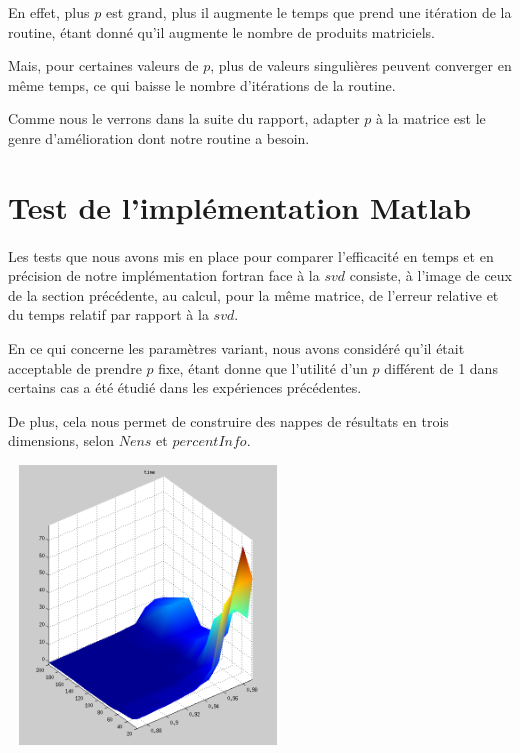 \documentclass[a4paper,12pt]{article}
\begin{document}
    En effet, plus $p$ est grand, plus il augmente le temps
    que prend une itération de la routine, étant donné qu'il augmente le nombre
    de produits matriciels.

    Mais, pour certaines valeurs de $p$, plus de valeurs singulières peuvent
    converger en même temps, ce qui baisse le nombre d'itérations de la routine.

    Comme nous le verrons dans la suite du rapport, adapter $p$ à la matrice est
    le genre d'amélioration dont notre routine a besoin.

\newpage
\section{Test de l'implémentation Matlab}

    \paragraph{}
    Les tests que nous avons mis en place pour comparer l'efficacité en temps et
    en précision de notre implémentation fortran face à la $svd$ consiste, à l'image
    de ceux de la section précédente, au calcul, pour la même matrice, de l'erreur
    relative et du temps relatif par rapport à la $svd$.

    En ce qui concerne les paramètres variant, nous avons considéré qu'il était
    acceptable de prendre $p$ fixe, étant donne que l'utilité d'un $p$ différent de 1
    dans certains cas a été étudié dans les expériences précédentes.

    De plus, cela nous permet de construire des nappes de résultats en trois dimensions,
    selon $Nens$ et $percentInfo$.

    \bigskip
    \begin{center}
    \includegraphics[width=20em, height=20em]{time1.png}
    \end{center}
\end{document}
